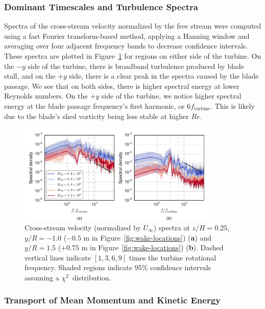 \documentclass[energies,article,accept,moreauthors,pdftex,10pt,a4paper]{mdpi}
\theoremstyle{mdpi}
\newcounter{ex}
\newcounter{re}
\begin{document}
\subsubsection{Dominant Timescales and Turbulence Spectra}

Spectra of the cross-stream velocity normalized by the free stream were computed
using a fast Fourier transform-based method, applying a Hanning window and
averaging over four adjacent frequency bands to decrease confidence intervals.
These spectra are plotted in Figure~\ref{fig:wake-spectra} for regions on either
side of the turbine. On the $-y$ side of the turbine, there is broadband
turbulence produced by blade stall, and on the $+y$ side, there is a clear peak
in the spectra caused by the blade passage. We see that on both sides, there is
higher spectral energy at lower Reynolds numbers. On the $+y$ side of the
turbine, we notice higher spectral energy at the blade passage frequency's first
harmonic, or $6 f_\mathrm{turbine}$. This is likely due to the blade's shed
vorticity being less stable at higher $Re$.

\begin{figure}[H]
    \centering

    \includegraphics[width=0.85\textwidth]{figures/wake_spectra}

    \caption{Cross-stream velocity (normalized by $U_\infty$) spectra at
        $z/H=0.25$, $y/R=-1.0$ ($-0.5$ m in Figure~\ref{fig:wake-locations})
        (\textbf{a}) and $y/R=1.5$ ($+0.75$ m in Figure~\ref{fig:wake-locations})
        (\textbf{b}). Dashed vertical lines indicate $[1, 3, 6, 9]$ times the
        turbine rotational frequency. Shaded regions indicate 95\% confidence
        intervals assuming a $\chi^2$~distribution.}

    \label{fig:wake-spectra}
\end{figure}


\subsubsection{Transport of Mean Momentum and Kinetic Energy}
\end{document}
